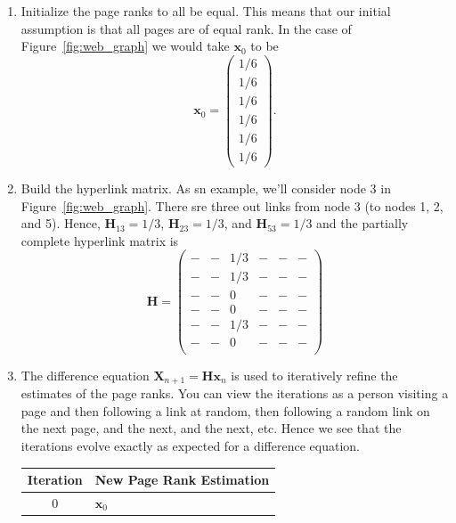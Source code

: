 \documentclass{article}
\begin{document}
\begin{enumerate}
    \item Initialize the page ranks to all be equal. This means that our initial assumption is that all pages are of equal rank. In the case of Figure~\ref{fig:web_graph} we would take $\boldsymbol{x}_0$ to be
        $$
            \boldsymbol{x}_0=
            \begin{pmatrix}
                1/6\\1/6\\1/6\\1/6\\1/6\\1/6
            \end{pmatrix}.
        $$
    \item Build the hyperlink matrix. As sn example, we'll consider node 3 in Figure~\ref{fig:web_graph}.
            There sre three out links from node 3 (to nodes 1, 2, and 5). Hence, $\boldsymbol{H}_{13}=1/3$, $\boldsymbol{H}_{23}=1/3$, and $\boldsymbol{H}_{53}=1/3$ 
            and the partially complete hyperlink matrix is
            $$\boldsymbol{H}=\begin{pmatrix}
                -&-&1/3&-&-&-\\
                -&-&1/3&-&-&-\\
                -&-&0&-&-&-\\
                -&-&0&-&-&-\\
                -&-&1/3&-&-&-\\
                -&-&0&-&-&-\\
            \end{pmatrix}
            $$
    \item The difference equation $\boldsymbol{X}_{n+1}=\boldsymbol{H}\boldsymbol{x}_n$ is used to iteratively refine the estimates of the page ranks. You can view the iterations as a person visiting a page and then following a link at random, then following a random link on the next page, and the next, and the next, etc. Hence we see that the iterations evolve exactly as expected for a difference equation.
            \begin{table}[H]
                \centering
                \begin{tabular}{|c|>{\raggedright\arraybackslash}p{6cm}|}
                \hline
                \textbf{Iteration} & \textbf{New Page Rank Estimation} \\
                \hline
                0 & $\boldsymbol{x}_0$ \\

\end{tabular}
\end{table}
\end{enumerate}
\end{document}
